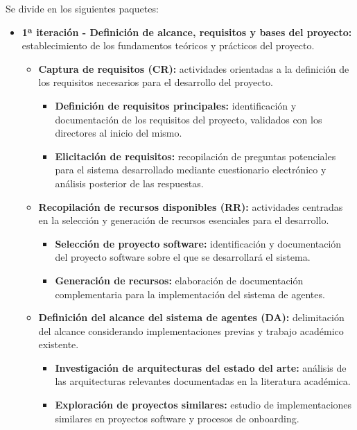 Se divide en los siguientes paquetes:

\begin{itemize}
  \item\textbf{1ª iteración - Definición de alcance, requisitos y bases del proyecto: }establecimiento de los fundamentos teóricos y prácticos del proyecto.
    \begin{itemize}
      \item\textbf{Captura de requisitos (CR):} actividades orientadas a la definición de los requisitos necesarios para el desarrollo del proyecto.
            \begin{itemize}
          \item\textbf{Definición de requisitos principales:} identificación y documentación de los requisitos del proyecto, validados con los directores al inicio del mismo.
          \item\textbf{Elicitación de requisitos:} recopilación de preguntas potenciales para el sistema desarrollado mediante cuestionario electrónico y análisis posterior de las respuestas.
        \end{itemize}
      \item\textbf{Recopilación de recursos disponibles (RR):} actividades centradas en la selección y generación de recursos esenciales para el desarrollo.
        \begin{itemize}
          \item\textbf{Selección de proyecto software:} identificación y documentación del proyecto software sobre el que se desarrollará el sistema.
          \item\textbf{Generación de recursos:} elaboración de documentación complementaria para la implementación del sistema de agentes.
        \end{itemize}
      \item\textbf{Definición del alcance del sistema de agentes (DA):} delimitación del alcance considerando implementaciones previas y trabajo académico existente.
    \begin{itemize}
          \item\textbf{Investigación de arquitecturas del estado del arte:} análisis de las arquitecturas relevantes documentadas en la literatura académica.
          \item\textbf{Exploración de proyectos similares:} estudio de implementaciones similares en proyectos software y procesos de onboarding.
    \end{itemize}
      \end{itemize}

\end{itemize}
